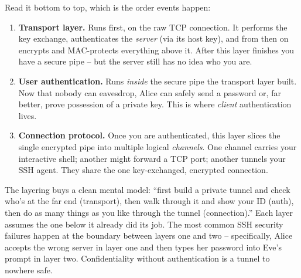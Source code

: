 \begin{center}
\end{center}

Read it bottom to top, which is the order events happen:

\begin{enumerate}
  \item \textbf{Transport layer.} Runs first, on the raw TCP connection. It performs the key exchange, authenticates the \emph{server} (via its host key), and from then on encrypts and MAC-protects everything above it. After this layer finishes you have a secure pipe -- but the server still has no idea who you are.
  \item \textbf{User authentication.} Runs \emph{inside} the secure pipe the transport layer built. Now that nobody can eavesdrop, Alice can safely send a password or, far better, prove possession of a private key. This is where \emph{client} authentication lives.
  \item \textbf{Connection protocol.} Once you are authenticated, this layer slices the single encrypted pipe into multiple logical \emph{channels}. One channel carries your interactive shell; another might forward a TCP port; another tunnels your SSH agent. They share the one key-exchanged, encrypted connection.
\end{enumerate}

\begin{intuitionbox}
The layering buys a clean mental model: ``first build a private tunnel and check who's at the far end (transport), then walk through it and show your ID (auth), then do as many things as you like through the tunnel (connection).'' Each layer assumes the one below it already did its job. The most common SSH security failures happen at the boundary between layers one and two -- specifically, Alice accepts the wrong server in layer one and then types her password into Eve's prompt in layer two. Confidentiality without authentication is a tunnel to nowhere safe.
\end{intuitionbox}

